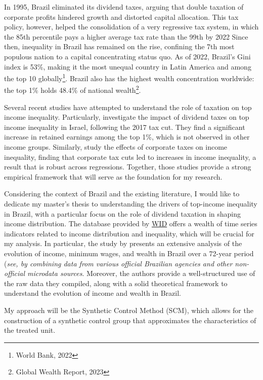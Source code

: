 \documentclass[a4paper, 12pt]{article}
\begin{document}
\pagebreak
In 1995, Brazil eliminated its dividend taxes, arguing that double taxation of corporate profits hindered growth and distorted capital allocation.
This tax policy, however, helped the consolidation of a very regressive tax system, in which the 85th percentile pays a higher average tax rate than the 99th by 2022 
Since then, inequality in Brazil has remained on the rise, confining the 7th most populous nation to a capital concentrating status quo. 
As of 2022, Brazil's Gini index is 53\%, making it the most unequal country in Latin America and among the top 10 globally\footnote{World Bank, 2022}.
Brazil also has the highest wealth concentration worldwide: the top 1\% holds 48.4\% of national wealth\footnote{Global Wealth Report, 2023}.
\par
Several recent studies have attempted to understand the role of taxation on top income inequality. 
Particularly, \cite{berman2024capital} investigate the impact of dividend taxes on top income inequality in Israel, following the 2017 tax cut. 
They find a significant increase in retained earnings among the top 1\%, which is not observed in other income groups.
Similarly, \cite{nallareddy2021corporate} study the effects of corporate taxes on income inequality, finding that corporate tax cuts led to increases in income inequality, a result that is robust across regressions.
Together, those studies provide a strong empirical framework that will serve as the foundation for my research.
\par
Considering the context of Brazil and the existing literature, I would like to dedicate my master’s thesis to understanding the drivers of top-income inequality in Brazil, with a particular focus on the role of dividend taxation in shaping income distribution.
The database provided by \href{https://wid.world/country/brazil/}{WID} offers a wealth of time series indicators related to income distribution and inequality, which will be crucial for my analysis.
In particular, the study by \cite{morgan2025distribution} presents an extensive analysis of the evolution of income, minimum wages, and wealth in Brazil over a 72-year period (\textit{see, by combining data from various official Brazilian agencies and other non-official microdata sources}.
Moreover, the authors provide a well-structured use of the raw data they compiled, along with a solid theoretical framework to understand the evolution of income and wealth in Brazil.
\par    
My approach will be the Synthetic Control Method (SCM), which allows for the construction of a synthetic control group that approximates the characteristics of the treated unit.
\end{document}
